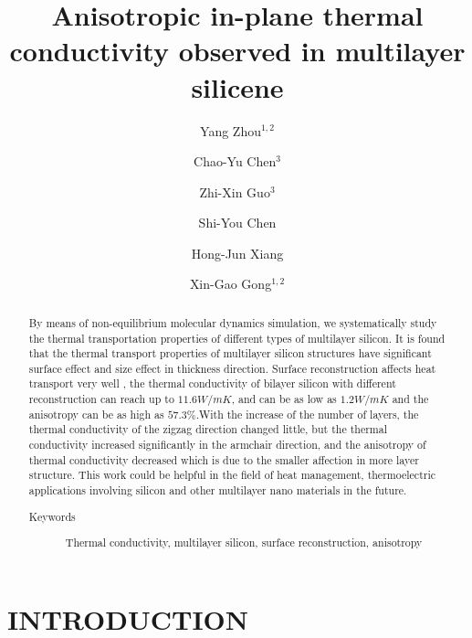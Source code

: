 \documentclass[%
 reprint,
 amsmath,amssymb,
 aps,
 prb,
]{revtex4-1}
\begin{document}
\title{Anisotropic in-plane thermal conductivity observed in multilayer silicene}
\author{Yang Zhou${}^{1,2}$}
\author{Chao-Yu Chen${}^{3}$}
\author{Zhi-Xin Guo${}^{3}$}
\author{Shi-You Chen}
\author{Hong-Jun Xiang}
\author{Xin-Gao Gong${}^{1,2}$}
\begin{abstract}
  By means of non-equilibrium molecular dynamics simulation, we systematically study the thermal transportation properties of different types of multilayer silicon. It is found that the thermal transport properties of multilayer silicon structures have significant surface effect and size effect in thickness direction. Surface reconstruction affects heat transport very well , the thermal conductivity of bilayer silicon with different reconstruction can reach up to $11.6 W/mK$, and can be as low as $1.2 W/mK$ and the anisotropy can be as high as $57.3\%$.With the increase of the number of layers, the thermal conductivity of the zigzag direction changed little, but the thermal conductivity increased significantly in the armchair direction, and the anisotropy of thermal conductivity decreased which is due to the smaller affection in more layer structure. This work could be helpful in the field of heat management, thermoelectric applications involving silicon and other multilayer nano materials in the future.
  \begin{description}
    \item[Keywords]
          Thermal conductivity, multilayer silicon, surface reconstruction, anisotropy
  \end{description}
\end{abstract}

\maketitle

\section{INTRODUCTION}
\end{document}
